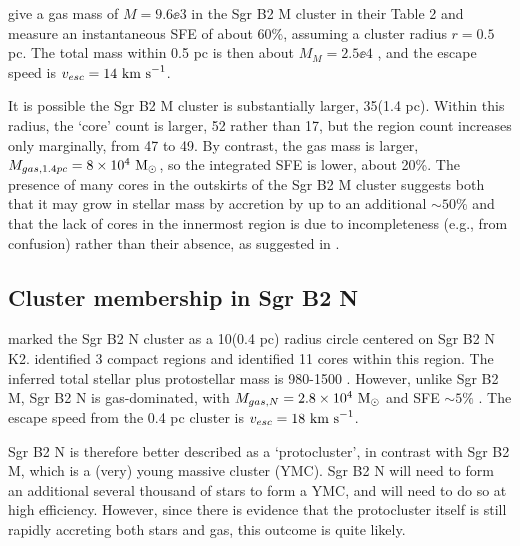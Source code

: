\documentclass[twocolumn]{aastex61}
\begin{document}

\citet{Schmiedeke2016a} give a gas mass of $M=9.6\ee{3}$ \msun in the Sgr B2 M
cluster in their Table 2 and measure an instantaneous SFE of about 60\%, assuming
a cluster radius $r=0.5$ pc.  The total mass within 0.5 pc is then about $M_M =
2.5\ee{4}$ \msun, and the escape speed is $v_{esc}=14~\textrm{km~s}^{-1}$.



It is possible the Sgr B2 M cluster is substantially larger, 35\arcsec (1.4 pc).
Within this radius, the `core' count is larger, 52 rather than 17, but the \hii
region count increases only marginally, from 47 to 49.  By contrast,
the gas mass is larger, $M_{gas,1.4pc} = 8\times10^{4}~\mathrm{M}_{\odot}$, so the integrated SFE is lower,
about 20\%.  
The presence of many cores in the outskirts of the Sgr B2 M cluster suggests
both that it may grow in stellar mass by accretion by up to an additional
$\sim50\%$ and that the lack of cores in the innermost region is due to
incompleteness (e.g., from confusion) rather than their absence, as suggested
in \citet{Ginsburg2018a}.

\subsection{Cluster membership in Sgr B2 N}
\citet{Schmiedeke2016a} marked the Sgr B2 N cluster as a 10\arcsec  (0.4 pc) radius circle
centered on Sgr B2 N K2.  \citet{Schmiedeke2016a} identified 3 compact \hii regions
and \citet{Ginsburg2018a} identified 11 cores within this region.  The inferred
total stellar plus protostellar mass is 980-1500 \msun.  However, unlike Sgr B2
M, Sgr B2 N is gas-dominated, with $M_{gas,N} = 2.8\times10^{4}~\mathrm{M}_{\odot}$ and SFE
$\sim5\%$ \citep{Schmiedeke2016a}.  The escape speed from the 0.4 pc cluster is
$v_{esc} = 18~\textrm{km~s}^{-1}$.

Sgr B2 N is therefore better described as a `protocluster', in contrast with
Sgr B2 M, which is a (very) young massive cluster (YMC).  Sgr B2 N will need to
form an additional several thousand \msun of stars to form a YMC, and will need
to do so at high efficiency.  However, since there is evidence that the
protocluster itself is still rapidly accreting both stars and gas, this outcome
is quite likely.
\end{document}
